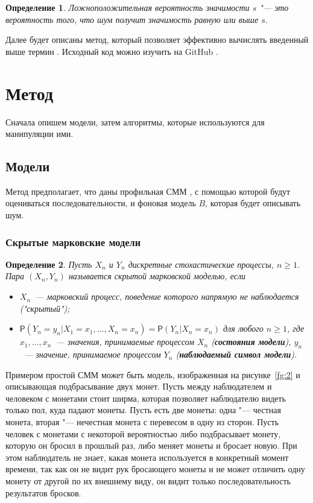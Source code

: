 \documentclass[specialist,
substylefile = spbu_report.rtx,
subf,href,colorlinks=true, 12pt]{disser}
\newtheorem{defenition}{Определение}
\begin{document}
		\begin{defenition}
			Ложноположительная вероятность значимости $s$ "--- это вероятность того, что шум получит значимость равную или выше $s$.  
		\end{defenition}		
		
		Далее будет описаны метод, который позволяет эффективно вычислять введенный выше термин \cite{Newberg2009}. Исходный код можно изучить на GitHub \cite{Vlasenko2022}.
		
		\section{Метод}
		Сначала опишем модели, затем алгоритмы, которые используются для манипуляции ими.
		\subsection{Модели}
		Метод предполагает, что даны профильная СММ \cite{Compeau2015a}, с помощью которой будут оцениваться последовательности, и фоновая модель $B$, которая будет описывать шум.
		\subsubsection{Скрытые марковские модели}						
			\begin{defenition}
				Пусть $X_{n}$ и $Y_{n}$ дискретные стохастические процессы, $n \geq 1$. Пара $(X_{n}, Y_{n})$ называется скрытой марковской моделью, если
				\begin{itemize}
					\item $X_{n}$~--- марковский процесс, поведение которого напрямую не наблюдается ("скрытый");
					\item $\mathsf{P}(Y_{n} = y_{n}|X_{1} = x_{1},\dots, X_{n} = x_{n}) = \mathsf{P}(Y_{n}|X_{n}=x_{n})$ для любого $n \geq 1$, где $x_{1},\dots,x_{n}$~--- значения, принимаемые процессом  $X_{n}$ (\textbf{состояния модели}), $ y_{n}$~--- значение, принимаемое процессом $Y_{n}$ (\textbf{наблюдаемый символ модели}).
				\end{itemize}
			\end{defenition}
		
			Примером простой СММ может быть модель, изображенная на рисунке~\ref{fg:2} и описывающая подбрасывание двух монет. Пусть между наблюдателем и человеком с монетами стоит ширма, которая позволяет наблюдателю видеть только пол, куда падают монеты. Пусть есть две монеты: одна "--- честная монета, вторая "--- нечестная монета с перевесом в одну из сторон. Пусть человек с монетами с некоторой вероятностью либо подбрасывает монету, которую он бросил в прошлый раз, либо меняет монеты и бросает новую. При этом наблюдатель не знает, какая монета используется в конкретный момент времени, так как он не видит рук бросающего монеты и не может отличить одну монету от другой по их внешнему виду, он видит только последовательность результатов бросков.
			
\end{document}
